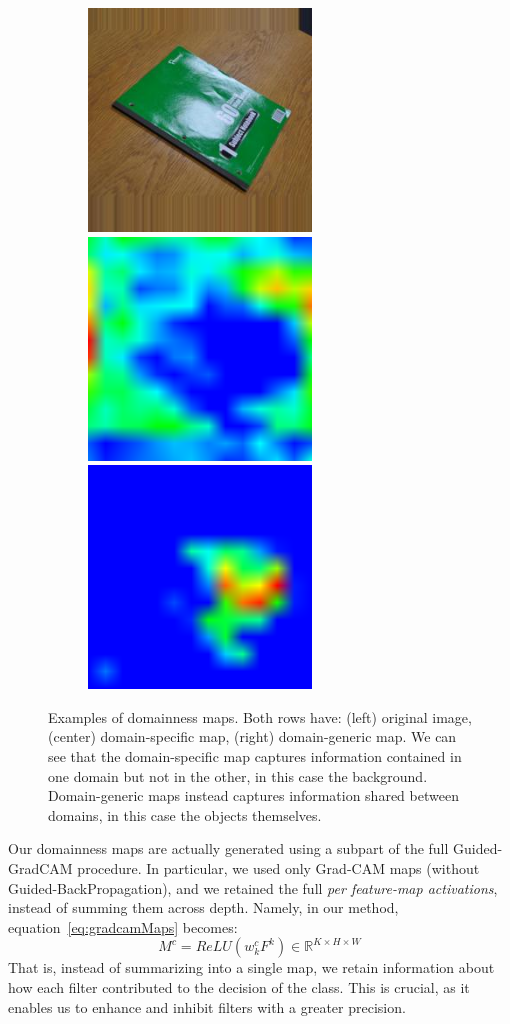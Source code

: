 \documentclass[../main.tex]{subfiles}
\begin{document}
\begin{figure}[h!]
        \begin{subfigure}{\linewidth}
        	\includegraphics[width=.3\linewidth]{img/d1.png}\label{fig:dslr-1}\hfill
        	\includegraphics[width=.3\linewidth]{img/d-ad-d-1.png}\label{fig:dslr-dslr-1}\hfill
            \includegraphics[width=.3\linewidth]{img/d-ad-a-1.png}\label{fig:dslr-amazon-1}
        \end{subfigure}

        \caption{Examples of domainness maps. Both rows have: (left) original image, (center) domain-specific map,
            (right) domain-generic map. We can see that the domain-specific map captures information contained in one domain
            but not in the other, in this case the background. Domain-generic maps instead captures information shared between
            domains, in this case the objects themselves.}\label{fig:domain-shift-office}
	\end{figure}

    Our domainness maps are actually generated using a subpart of the full Guided-GradCAM procedure.
    In particular, we used only Grad-CAM maps (without Guided-BackPropagation), and we retained the full
    \textit{per feature-map activations}, instead of summing them across depth.
    Namely, in our method, equation~\ref{eq:gradcamMaps} becomes:
    \begin{equation}\label{eq:gradcamDomain}
        M^{c} = ReLU \left( w_{k}^{c} F^{k} \right) \in \mathbb{R}^{K \times H \times W}
    \end{equation}
    That is, instead of summarizing into a single map, we retain information about how each filter contributed to the decision
    of the class. This is crucial, as it enables us to enhance and inhibit filters with a greater precision.
    
\end{document}
